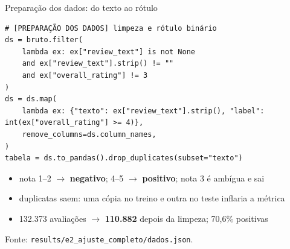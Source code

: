 \documentclass[aspectratio=169,10pt]{beamer}
\newcommand{\fonte}[1]{\par\vfill{\scriptsize\color{tinta2}Fonte: #1}}
\newcommand{\destaque}[1]{{\color{azul}\bfseries #1}}
\begin{document}
\begin{frame}[fragile]{Preparação dos dados: do texto ao rótulo}
  \begin{lstlisting}
# [PREPARAÇÃO DOS DADOS] limpeza e rótulo binário
ds = bruto.filter(
    lambda ex: ex["review_text"] is not None
    and ex["review_text"].strip() != ""
    and ex["overall_rating"] != 3
)
ds = ds.map(
    lambda ex: {"texto": ex["review_text"].strip(), "label": int(ex["overall_rating"] >= 4)},
    remove_columns=ds.column_names,
)
tabela = ds.to_pandas().drop_duplicates(subset="texto")
  \end{lstlisting}
  \begin{itemize}
    \item nota 1--2 $\to$ \textbf{negativo}; 4--5 $\to$ \textbf{positivo}; nota 3 é ambígua e \alert{sai}
    \item duplicatas saem: uma cópia no treino e outra no teste inflaria a métrica
    \item 132.373 avaliações $\to$ \destaque{110.882} depois da limpeza; 70,6\% positivas
  \end{itemize}
  \fonte{\texttt{results/e2\_ajuste\_completo/dados.json}.}
\end{frame}
\end{document}
